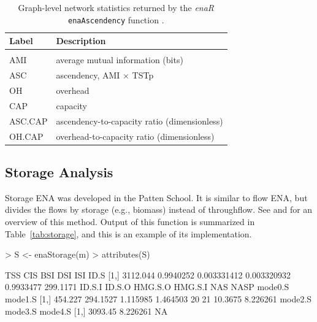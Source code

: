 \documentclass[article]{jss}
\begin{document}
\begin{table}[t]
  \caption{Graph-level network statistics returned by the \textit{enaR}
    \texttt{enaAscendency} function \citep[see][for
    interpretations]{ulanowicz86, ulanowicz97}.}\label{tab:asc}
  \center
  \begin{small}
    \begin{tabular}{l l}
      \textbf{Label} & \textbf{Description} \\ \hline \\[-1.5ex]
      AMI & average mutual information (bits) \\
      ASC & ascendency, AMI $\times$ TSTp \\
      OH & overhead \\
      CAP& capacity \\
      ASC.CAP& ascendency-to-capacity ratio (dimensionless)\\
      OH.CAP& overhead-to-capacity ratio (dimensionless)\\
      \hline
    \end{tabular}
  \end{small}
\end{table}

\subsection{Storage Analysis}
Storage ENA was developed in the Patten School.  It is similar to flow
ENA, but divides the flows by storage (e.g., biomass) instead of
throughflow.  See \citet{fath99_review} and \citet{schramski11} for an
overview of this method.  Output of this function is summarized in
Table~\ref{tab:storage}, and this is an example of its implementation.

\begin{Schunk}
\begin{Sinput}
> S <- enaStorage(m)
> attributes(S)
\end{Sinput}
\begin{Soutput}
          TSS       CIS         BSI         DSI       ISI     ID.S
[1,] 3112.044 0.9940252 0.003331412 0.003320932 0.9933477 299.1171
      ID.S.I   ID.S.O  HMG.S.O  HMG.S.I NAS NASP mode0.S  mode1.S
[1,] 454.227 294.1527 1.115985 1.464503  20   21 10.3675 8.226261
     mode2.S  mode3.S mode4.S
[1,] 3093.45 8.226261      NA
\end{Soutput}
\end{Schunk}
\end{document}
